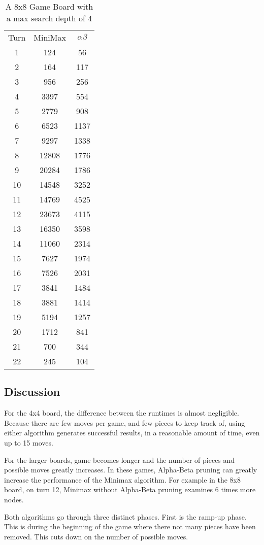 \documentclass[12pt,letterpaper]{article}
\begin{document}
\begin{table}[h!]
\centering
\begin{tabular}{|c|c|c|}
\hline
Turn & MiniMax & $\alpha \beta$ \\
1 & 124 & 56 \\
2 & 164 & 117 \\
3 & 956 & 256 \\
4 & 3397 & 554 \\
5 & 2779 & 908 \\
6 & 6523 & 1137 \\
7 & 9297 & 1338\\
8 & 12808 & 1776\\
9  & 20284 & 1786\\
10 & 14548 & 3252\\
11 & 14769 & 4525\\
12 & 23673 & 4115\\
13 & 16350 & 3598\\
14 & 11060 & 2314\\
15 & 7627 & 1974\\
16 & 7526 & 2031\\
17 & 3841 & 1484\\
18 & 3881 & 1414\\
19 & 5194 & 1257\\
20 & 1712 & 841\\
21 & 700 & 344\\
22 & 245 & 104 \\
\hline
\end{tabular}
\caption{A 8x8 Game Board with a max search depth of 4}
\end{table}

\subsection{Discussion}
For the 4x4 board, the difference between the runtimes is almost negligible. Because there are few moves per game, and few pieces to keep track of, using either algorithm generates successful results, in a reasonable amount of time, even up to 15 moves. 

For the larger boards, game becomes longer and the number of pieces and possible moves greatly increases. In these games, Alpha-Beta pruning can greatly increase the performance of the Minimax algorithm. For example in the 8x8 board, on turn 12, Minimax without Alpha-Beta pruning examines 6 times more nodes. 

Both algorithms go through three distinct phases. First is the ramp-up phase. This is during the beginning of the game where there not many pieces have been removed. This cuts down on the number of possible moves. 
\end{document}
